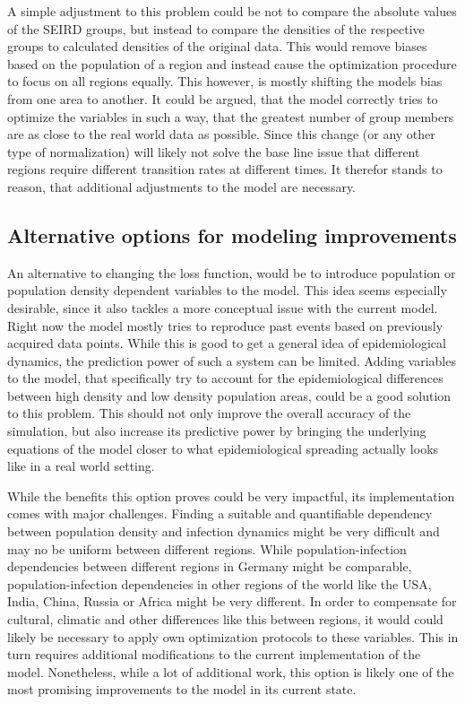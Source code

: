 A simple adjustment to this problem could be not to compare the absolute values of the SEIRD groups, but instead to compare the
densities of the respective groups to calculated densities of the original data. This would remove biases based on the population
of a region and instead cause the optimization procedure to focus on all regions equally. This however, is mostly shifting the models
bias from one area to another. It could be argued, that the model correctly tries to optimize the variables in such a way, that the greatest
number of group members are as close to the real world data as possible. Since this change (or any other type of normalization) will likely
not solve the base line issue that different regions require different transition rates at different times. It therefor stands to reason, that
additional adjustments to the model are necessary.

\subsection{Alternative options for modeling improvements}
An alternative to changing the loss function, would be to introduce population or population density dependent variables
to the model. This idea seems especially desirable, since it also tackles a more conceptual issue with the current model. Right
now the model mostly tries to reproduce past events based on previously acquired data points. While this is good to get a general
idea of epidemiological dynamics, the prediction power of such a system can be limited. Adding variables to the model,
that specifically try to account for the epidemiological differences between high density and low density population areas, could
be a good solution to this problem. This should not only improve the overall accuracy of the simulation, but also increase its 
predictive power by bringing the underlying equations of the model closer to what epidemiological spreading actually looks like in a real world setting.
\newline

While the benefits this option proves could be very impactful, its implementation comes with major challenges. Finding a suitable and quantifiable
dependency between population density and infection dynamics might be very difficult and may no be uniform between different
regions. While population-infection dependencies between different regions in Germany might be comparable, population-infection
dependencies in other regions of the world like the USA, India, China, Russia or Africa might be very different. In order to compensate
for cultural, climatic and other differences like this between regions, it would could likely be necessary to apply own optimization protocols to these
variables. This in turn requires additional modifications to the current implementation of the model. Nonetheless, while a lot of
additional work, this option is likely one of the most promising improvements to the model in its current state.\newline 

